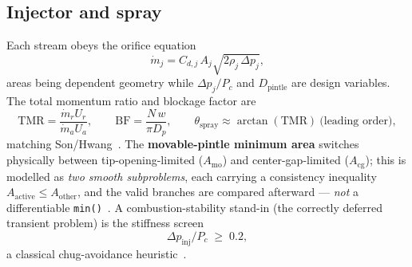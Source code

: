 \documentclass[11pt]{article}
\newcommand{\cmd}[1]{\nolinkurl{#1}}
\newcommand{\mdot}{\dot m}
\begin{document}
\subsection{Injector and spray}
Each stream obeys the orifice equation
\begin{equation}
\mdot_j=C_{d,j}\,A_j\sqrt{2\rho_j\,\Delta p_j},
\end{equation}
areas being dependent geometry while $\Delta p_j/P_c$ and $D_\mathrm{pintle}$ are
design variables. The total momentum ratio and blockage factor are
\begin{equation}
\mathrm{TMR}=\frac{\dot m_r U_r}{\dot m_a U_a},
\qquad
\mathrm{BF}=\frac{N\,w}{\pi D_p},
\qquad
\theta_\mathrm{spray}\approx\arctan(\mathrm{TMR})\ \text{(leading order)},
\end{equation}
matching Son/Hwang~\cite{son2017,son2015}. The \textbf{movable-pintle minimum
area} switches physically between tip-opening-limited ($A_\mathrm{mo}$) and
center-gap-limited ($A_\mathrm{cg}$); this is modelled as \emph{two smooth
subproblems}, each carrying a consistency inequality
$A_\mathrm{active}\le A_\mathrm{other}$, and the valid branches are compared
afterward --- \emph{not} a differentiable \cmd{min()}~\cite{son2017}. A
combustion-stability stand-in (the correctly deferred transient problem) is the
stiffness screen
\begin{equation}
\Delta p_\mathrm{inj}/P_c\;\ge\;0.2 ,
\end{equation}
a classical chug-avoidance heuristic~\cite{sp8089,sp194}.
\end{document}
